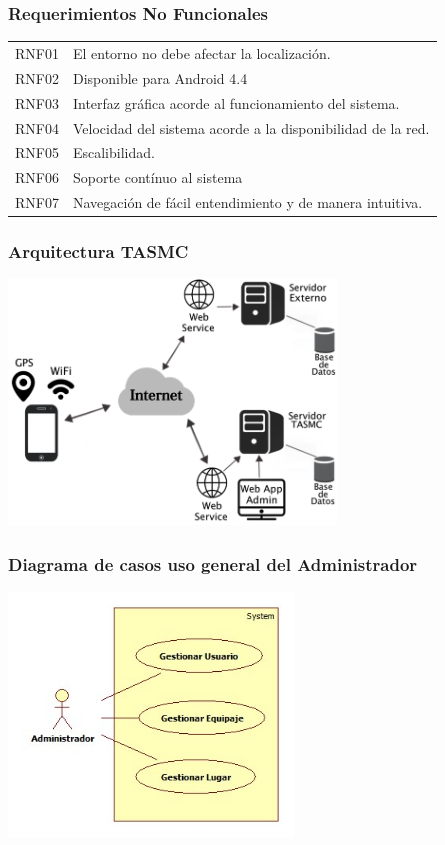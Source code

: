 \documentclass[12pt]{beamer}
\begin{document}
\begin{frame}
	\frametitle{Requerimientos No Funcionales}
	\begin{block}{}
	\begin{center}
	

	\begin{tabular}{c|l}
			RNF01 & El entorno no debe afectar la localización.\\
			RNF02 & Disponible para Android 4.4\\
			RNF03 & Interfaz gráfica acorde al funcionamiento del sistema.\\
      		RNF04 & Velocidad del sistema acorde a la disponibilidad de la red.\\
      		RNF05 & Escalibilidad.\\
      		RNF06 & Soporte contínuo al sistema\\
      		RNF07 & Navegación de fácil entendimiento y de manera intuitiva.\\
		\end{tabular}
			\end{center}
		\end{block}
\end{frame}


\begin{frame}
	\frametitle{Arquitectura TASMC}
	\begin{center}
		\includegraphics[height=6.5cm]{imagenes/arquitectura.png}	
	\end{center}
\end{frame}


\begin{frame}
	\frametitle{Diagrama de casos uso general del Administrador}
	\begin{center}
		\includegraphics[height=6.5cm]{imagenes/cugeneralAdministrador.jpg}	
	\end{center}
\end{frame}
\end{document}
